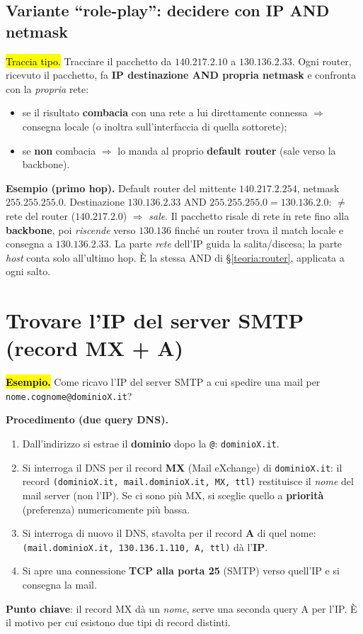 \documentclass[11pt,a4paper]{report}
\begin{document}
\subsection*{Variante ``role-play'': decidere con IP AND netmask}
\hl{Traccia tipo.} Tracciare il pacchetto da $140.217.2.10$ a $130.136.2.33$.
Ogni router, ricevuto il pacchetto, fa \textbf{IP destinazione AND propria
netmask} e confronta con la \emph{propria} rete:
\begin{itemize}[noitemsep]
\item se il risultato \textbf{combacia} con una rete a lui direttamente connessa
$\Rightarrow$ consegna locale (o inoltra sull'interfaccia di quella sottorete);
\item se \textbf{non} combacia $\Rightarrow$ lo manda al proprio
\textbf{default router} (sale verso la backbone).
\end{itemize}
\textbf{Esempio (primo hop).} Default router del mittente $140.217.2.254$, netmask
$255.255.255.0$. Destinazione $130.136.2.33$ AND $255.255.255.0 = 130.136.2.0$:
$\neq$ rete del router ($140.217.2.0$) $\Rightarrow$ \emph{sale}. Il pacchetto
risale di rete in rete fino alla \textbf{backbone}, poi \emph{riscende} verso
$130.136$ finché un router trova il match locale e consegna a $130.136.2.33$. La
parte \emph{rete} dell'IP guida la salita/discesa; la parte \emph{host} conta
solo all'ultimo hop. È la stessa AND di \S\ref{teoria:router}, applicata a ogni
salto.

\section{Trovare l'IP del server SMTP (record MX + A)}
\label{teoria:smtp}
\hl{\textbf{Esempio.}} Come ricavo l'IP del server SMTP a cui
spedire una mail per \texttt{nome.cognome@dominioX.it}?

\textbf{Procedimento (due query DNS).}
\begin{enumerate}[noitemsep]
\item Dall'indirizzo si estrae il \textbf{dominio} dopo la \texttt{@}:
\texttt{dominioX.it}.
\item Si interroga il DNS per il record \textbf{MX} (Mail eXchange) di
\texttt{dominioX.it}: il record \texttt{(dominioX.it, mail.dominioX.it, MX, ttl)}
restituisce il \emph{nome} del mail server (non l'IP). Se ci sono più MX, si
sceglie quello a \textbf{priorità} (preferenza) numericamente più bassa.
\item Si interroga di nuovo il DNS, stavolta per il record \textbf{A} di quel
nome: \texttt{(mail.dominioX.it, 130.136.1.110, A, ttl)} dà l'\textbf{IP}.
\item Si apre una connessione \textbf{TCP alla porta 25} (SMTP) verso quell'IP e
si consegna la mail.
\end{enumerate}
\textbf{Punto chiave}: il record MX dà un \emph{nome}, serve una seconda query A
per l'IP. È il motivo per cui esistono due tipi di record distinti.
\end{document}
